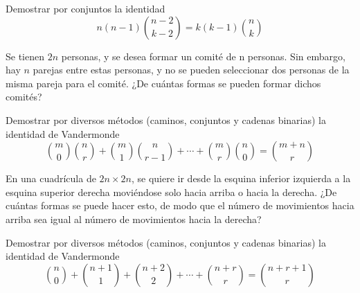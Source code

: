 \begin{problema}
    Demostrar por conjuntos la identidad
\[ n(n-1)\binom{n-2}{k-2} = k(k-1)\binom{n}{k} \]
\end{problema}

\begin{problema}
Se tienen $2n$ personas, y se desea formar un comité de n personas. Sin embargo, hay $n$ parejas entre estas personas, y no se pueden seleccionar dos personas de la misma pareja para el comité. ¿De cuántas formas se pueden formar dichos comités?
\end{problema}

\begin{problema}
    Demostrar por diversos métodos (caminos, conjuntos y cadenas binarias) la identidad de Vandermonde
\[ \binom{m}{0}\binom{n}{r} + \binom{m}{1}\binom{n}{r-1} + \cdots + \binom{m}{r}\binom{n}{0} = \binom{m+n}{r} \]

\end{problema}

\begin{problema}
En una cuadrícula de \(2n \times 2n\), se quiere ir desde la esquina inferior izquierda a la esquina superior derecha moviéndose solo hacia arriba o hacia la derecha. ¿De cuántas formas se puede hacer esto, de modo que el número de movimientos hacia arriba sea igual al número de movimientos hacia la derecha?
\end{problema}

\begin{problema}
   Demostrar por diversos métodos (caminos, conjuntos y cadenas binarias) la identidad de Vandermonde
\[ \binom{n}{0} + \binom{n+1}{1} + \binom{n+2}{2} + \cdots + \binom{n+r}{r} = \binom{n+r+1}{r} \]

\end{problema}
